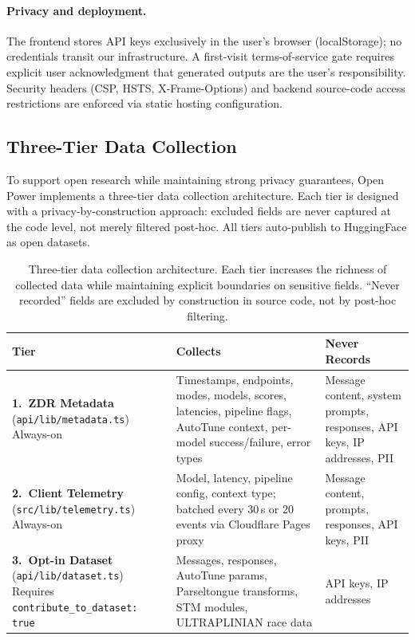 \documentclass[11pt]{article}
\begin{document}
\paragraph{Privacy and deployment.} The frontend stores API keys exclusively in the user's browser (localStorage); no credentials transit our infrastructure. A first-visit terms-of-service gate requires explicit user acknowledgment that generated outputs are the user's responsibility. Security headers (CSP, HSTS, X-Frame-Options) and backend source-code access restrictions are enforced via static hosting configuration.

\subsection{Three-Tier Data Collection}
\label{sec:datacollection}

To support open research while maintaining strong privacy guarantees, Open Power implements a three-tier data collection architecture. Each tier is designed with a privacy-by-construction approach: excluded fields are never captured at the code level, not merely filtered post-hoc. All tiers auto-publish to HuggingFace as open datasets.

\begin{table}[t]
\caption{Three-tier data collection architecture. Each tier increases the richness of collected data while maintaining explicit boundaries on sensitive fields. ``Never recorded'' fields are excluded by construction in source code, not by post-hoc filtering.}
\label{tab:datacollection}
\centering
\small
\begin{tabular}{@{}p{2.4cm}p{4.2cm}p{4.2cm}@{}}
\toprule
Tier & Collects & Never Records \\
\midrule
\textbf{1.\ ZDR Metadata} \newline (\texttt{api/lib/metadata.ts}) \newline Always-on &
Timestamps, endpoints, modes, models, scores, latencies, pipeline flags, AutoTune context, per-model success/failure, error types &
Message content, system prompts, responses, API keys, IP addresses, PII \\
\midrule
\textbf{2.\ Client Telemetry} \newline (\texttt{src/lib/telemetry.ts}) \newline Always-on &
Model, latency, pipeline config, context type; batched every 30\,s or 20 events via Cloudflare Pages proxy &
Message content, prompts, responses, API keys, PII \\
\midrule
\textbf{3.\ Opt-in Dataset} \newline (\texttt{api/lib/dataset.ts}) \newline Requires \texttt{contribute\_to\_dataset: true} &
Messages, responses, AutoTune params, Parseltongue transforms, STM modules, ULTRAPLINIAN race data &
API keys, IP addresses \\
\bottomrule
\end{tabular}
\end{table}
\end{document}
